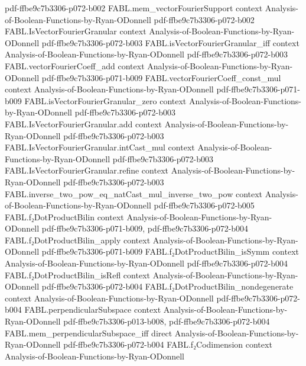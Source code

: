 \begin{theorem}
  {pdf-ffbe9c7b3306-p072-b002}
\proofstep
  {FABL.mem_vectorFourierSupport}
  {context}
  {Analysis-of-Boolean-Functions-by-Ryan-ODonnell}
  {pdf-ffbe9c7b3306-p072-b002}
\proofstep
  {FABL.IsVectorFourierGranular}
  {context}
  {Analysis-of-Boolean-Functions-by-Ryan-ODonnell}
  {pdf-ffbe9c7b3306-p072-b003}
\proofstep
  {FABL.isVectorFourierGranular_iff}
  {context}
  {Analysis-of-Boolean-Functions-by-Ryan-ODonnell}
  {pdf-ffbe9c7b3306-p072-b003}
\proofstep
  {FABL.vectorFourierCoeff_add}
  {context}
  {Analysis-of-Boolean-Functions-by-Ryan-ODonnell}
  {pdf-ffbe9c7b3306-p071-b009}
\proofstep
  {FABL.vectorFourierCoeff_const_mul}
  {context}
  {Analysis-of-Boolean-Functions-by-Ryan-ODonnell}
  {pdf-ffbe9c7b3306-p071-b009}
\proofstep
  {FABL.isVectorFourierGranular_zero}
  {context}
  {Analysis-of-Boolean-Functions-by-Ryan-ODonnell}
  {pdf-ffbe9c7b3306-p072-b003}
\proofstep
  {FABL.IsVectorFourierGranular.add}
  {context}
  {Analysis-of-Boolean-Functions-by-Ryan-ODonnell}
  {pdf-ffbe9c7b3306-p072-b003}
\proofstep
  {FABL.IsVectorFourierGranular.intCast_mul}
  {context}
  {Analysis-of-Boolean-Functions-by-Ryan-ODonnell}
  {pdf-ffbe9c7b3306-p072-b003}
\proofstep
  {FABL.IsVectorFourierGranular.refine}
  {context}
  {Analysis-of-Boolean-Functions-by-Ryan-ODonnell}
  {pdf-ffbe9c7b3306-p072-b003}
\proofstep
  {FABL.inverse_two_pow_eq_natCast_mul_inverse_two_pow}
  {context}
  {Analysis-of-Boolean-Functions-by-Ryan-ODonnell}
  {pdf-ffbe9c7b3306-p072-b005}
\proofstep
  {FABL.f₂DotProductBilin}
  {context}
  {Analysis-of-Boolean-Functions-by-Ryan-ODonnell}
  {pdf-ffbe9c7b3306-p071-b009,
    pdf-ffbe9c7b3306-p072-b004}
\proofstep
  {FABL.f₂DotProductBilin_apply}
  {context}
  {Analysis-of-Boolean-Functions-by-Ryan-ODonnell}
  {pdf-ffbe9c7b3306-p071-b009}
\proofstep
  {FABL.f₂DotProductBilin_isSymm}
  {context}
  {Analysis-of-Boolean-Functions-by-Ryan-ODonnell}
  {pdf-ffbe9c7b3306-p072-b004}
\proofstep
  {FABL.f₂DotProductBilin_isRefl}
  {context}
  {Analysis-of-Boolean-Functions-by-Ryan-ODonnell}
  {pdf-ffbe9c7b3306-p072-b004}
\proofstep
  {FABL.f₂DotProductBilin_nondegenerate}
  {context}
  {Analysis-of-Boolean-Functions-by-Ryan-ODonnell}
  {pdf-ffbe9c7b3306-p072-b004}
\proofstep
  {FABL.perpendicularSubspace}
  {context}
  {Analysis-of-Boolean-Functions-by-Ryan-ODonnell}
  {pdf-ffbe9c7b3306-p013-b008,
    pdf-ffbe9c7b3306-p072-b004}
\proofstep
  {FABL.mem_perpendicularSubspace_iff}
  {direct}
  {Analysis-of-Boolean-Functions-by-Ryan-ODonnell}
  {pdf-ffbe9c7b3306-p072-b004}
\proofstep
  {FABL.f₂Codimension}
  {context}
  {Analysis-of-Boolean-Functions-by-Ryan-ODonnell}

\end{theorem}
